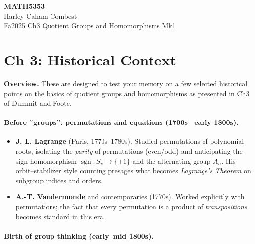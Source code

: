 \documentclass[9pt]{article}
\theoremstyle{definition}
\begin{document}
\begin{center}
\Large\textbf{MATH5353} \\
\large Harley Caham Combest \\
\large Fa2025 Ch3 Quotient Groups and Homomorphisms Mk1
\end{center}

\newpage

\dotfill
\section*{Ch 3: Historical Context}
\dotfill

\newpage

\noindent \textbf{Overview.} These are designed to test your memory on a few selected historical points on the basics of quotient groups and homomorphisms as presented in Ch3 of Dummit and Foote.\\

\newpage

\paragraph{Before “groups”: permutations and equations (1700s \textrightarrow\ early 1800s).}

\newpage

\begin{itemize}
  \item \textbf{J. L. Lagrange} (Paris, 1770s–1780s). Studied permutations of polynomial roots, isolating the \emph{parity} of permutations (even/odd) and anticipating the sign homomorphism $\operatorname{sgn}:S_n\to\{\pm1\}$ and the alternating group $A_n$. His orbit–stabilizer style counting presages what becomes \emph{Lagrange’s Theorem} on subgroup indices and orders.
  \item \textbf{A.-T. Vandermonde} and contemporaries (1770s). Worked explicitly with permutations; the fact that every permutation is a product of \emph{transpositions} becomes standard in this era.
\end{itemize}

\newpage

\paragraph{Birth of group thinking (early–mid 1800s).}

\newpage
\end{document}
